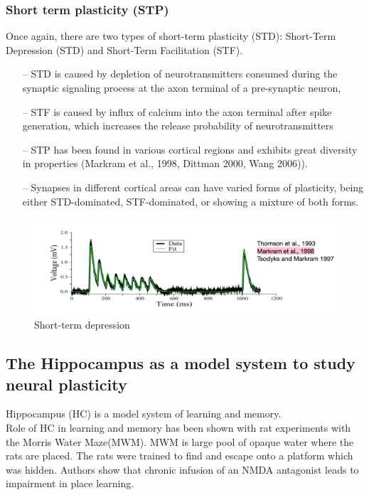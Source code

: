 \documentclass[main]{subfiles}
\begin{document}
\subsubsection{Short term plasticity (STP)}
Once again, there are two types of short-term plasticity (STD): Short-Term Depression (STD) and Short-Term Facilitation (STF). 

\begin{itemize}
    \item [--]STD is caused by depletion of neurotransmitters consumed during the synaptic signaling process at the axon terminal of a pre-synaptic neuron, 
    \item [--] STF is caused by influx of calcium into the axon terminal after spike generation, which increases the release probability of neurotransmitters
    \item [--]STP has been found in various cortical regions and exhibits great diversity in properties (Markram et al., 1998, Dittman 2000, Wang 2006)).
    \item [--]Synapses in different cortical areas can have varied forms of plasticity, being either STD-dominated, STF-dominated, or showing a mixture of both forms.
\end{itemize}

\begin{figure}[H]
    \centering
    \includegraphics[width=.8\textwidth]{03_PlasticityInTheBrain/figures/STD.png}
    \caption{Short-term depression}
    \label{fig:STD}
\end{figure}

\subsection{The Hippocampus as a model system to study neural plasticity}
Hippocampus (HC) is a model system of learning and memory. \\
\noindent
Role of HC in learning and memory has been shown with rat experiments with the Morris Water Maze(MWM). MWM is large pool of opaque water where the rats are placed. The rats were trained to find and escape onto a platform which was hidden. Authors show that chronic infusion of an NMDA antagonist leads to impairment in place learning.\\
\end{document}
